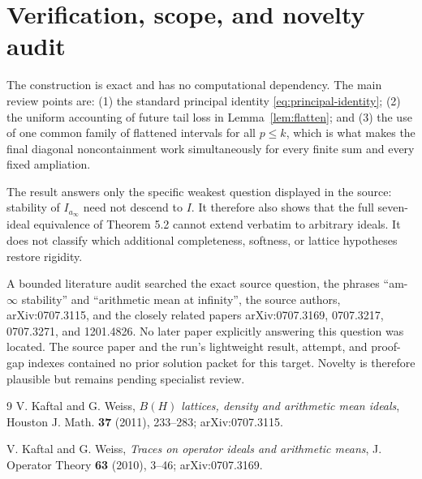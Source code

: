 \documentclass[11pt]{article}
\begin{document}
\section{Verification, scope, and novelty audit}

The construction is exact and has no computational dependency.  The main
review points are: (1) the standard principal identity
\eqref{eq:principal-identity}; (2) the uniform accounting of future tail loss
in Lemma~\ref{lem:flatten}; and (3) the use of one common family of flattened
intervals for all $p\le k$, which is what makes the final diagonal
noncontainment work simultaneously for every finite sum and every fixed
ampliation.

The result answers only the specific weakest question displayed in the source:
stability of $I_{a_\infty}$ need not descend to $I$.  It therefore also shows
that the full seven-ideal equivalence of Theorem 5.2 cannot extend verbatim to
arbitrary ideals.  It does not classify which additional completeness,
softness, or lattice hypotheses restore rigidity.

A bounded literature audit searched the exact source question, the phrases
``am-$\infty$ stability'' and ``arithmetic mean at infinity'', the source
authors, arXiv:0707.3115, and the closely related papers arXiv:0707.3169,
0707.3217, 0707.3271, and 1201.4826.  No later paper explicitly answering this
question was located.  The source paper and the run's lightweight result,
attempt, and proof-gap indexes contained no prior solution packet for this
target.  Novelty is therefore plausible but remains pending specialist review.

\begin{thebibliography}{9}
V. Kaftal and G. Weiss,
\emph{$B(H)$ lattices, density and arithmetic mean ideals},
Houston J. Math. \textbf{37} (2011), 233--283;
arXiv:0707.3115.

V. Kaftal and G. Weiss,
\emph{Traces on operator ideals and arithmetic means},
J. Operator Theory \textbf{63} (2010), 3--46;
arXiv:0707.3169.
\end{thebibliography}
\end{document}
